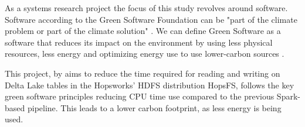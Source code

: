 As a systems research project the focus of this study revolves around software. Software according to the Green Software Foundation \cite{GreenSoftwareFoundation} can be "part of the climate problem or part of the climate solution" \cite{WhatGreenSoftware2021}. We can define Green Software as a software that reduces its impact on the environment by using less physical resources, less energy and optimizing energy use to use lower-carbon sources \cite{WhatGreenSoftware2021}.

This project, by aims to reduce the time required for reading and writing on Delta Lake tables in the Hopsworks' \gls{HDFS} distribution HopsFS, follows the key green software principles reducing CPU time use compared to the previous Spark-based pipeline. This leads to a lower carbon footprint, as less energy is being used.